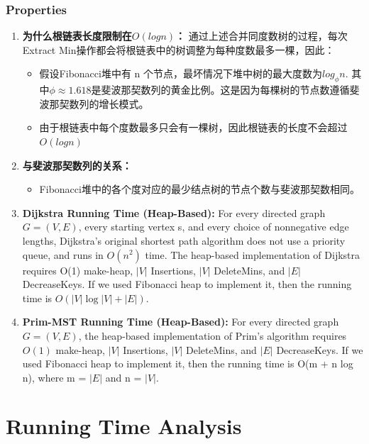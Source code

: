 \documentclass{article}
\begin{document}
\subsubsection{Properties}
\begin{enumerate}
    \item \textbf{为什么根链表长度限制在$O(log n)$：}
    通过上述合并同度数树的过程，每次Extract Min操作都会将根链表中的树调整为每种度数最多一棵，因此：\par
    \begin{itemize}
        \item 假设Fibonacci堆中有 n 个节点，最坏情况下堆中树的最大度数为$log_{\phi}n$. 其中$\phi \approx 1.618$是斐波那契数列的黄金比例。这是因为每棵树的节点数遵循斐波那契数列的增长模式。
        \item 由于根链表中每个度数最多只会有一棵树，因此根链表的长度不会超过$O(log n)$
    \end{itemize}
    \item \textbf{与斐波那契数列的关系：}
    \begin{itemize}
        \item Fibonacci堆中的各个度对应的最少结点树的节点个数与斐波那契数相同。
    \end{itemize}
    \item \textbf{Dijkstra Running Time (Heap-Based):}
    For every directed graph $G = (V, E)$, every starting vertex s, and every choice of nonnegative edge lengths, Dijkstra's original shortest path algorithm does not use a priority queue, and runs in $O(n^2)$ time. The heap-based implementation of Dijkstra requires O(1) make-heap, $ \lvert V \rvert$ Insertions, $ \lvert V \rvert$ DeleteMins, and $ \lvert E \rvert$ DecreaseKeys. If we used Fibonacci heap to implement it, then the running time is $O(\lvert V \rvert \log \lvert V \rvert + \lvert E \rvert)$.
    \item \textbf{Prim-MST Running Time (Heap-Based):}
    For every directed graph $G = (V, E)$, the heap-based implementation of Prim's algorithm requires $O(1)$ make-heap, $ \lvert V \rvert$ Insertions, $ \lvert V \rvert$ DeleteMins, and $ \lvert E \rvert$ DecreaseKeys. If we used Fibonacci heap to implement it, then the running time is O(m + n log n), where m = $ \lvert E \rvert$ and n = $ \lvert V \rvert$.
\end{enumerate}

\newpage

\section{Running Time Analysis}
\end{document}

